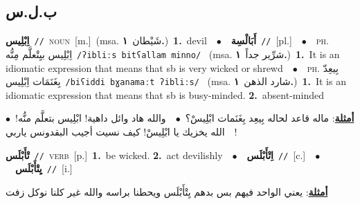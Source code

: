 \documentclass[10pt,a4paper,twoside]{article} %
\begin{document}
\begin{multicols}{2}
\vspace{-3mm}
\subsection*{\color{blue}\foreignlanguage{arabic}{ب.ل.س}\color{blue}{}} 

{\setlength\topsep{0pt}\textbf{\foreignlanguage{arabic}{اِبْلِيس}}\ {\color{gray}\texttt{//}\color{black}}\ \textsc{noun}\ [m.]\ \color{gray}(msa. \foreignlanguage{arabic}{شَيْطان}~\foreignlanguage{arabic}{\textbf{١.}})\color{black}\ \textbf{1.}~devil\ \ $\bullet$\ \ \setlength\topsep{0pt}\textbf{\foreignlanguage{arabic}{أَبَالْسِة}}\ {\color{gray}\texttt{//}\color{black}}\ [pl.]\ \ $\bullet$\ \ \textsc{ph.} \color{gray} \foreignlanguage{arabic}{اِبْلِيس بيِتْعلَّم مِنُّه}\color{black}\ {\color{gray}\texttt{/{\sffamily ʔibliːs bitʕallam minno}/}\color{black}}\ \color{gray} (msa. \foreignlanguage{arabic}{شرِّير جداً}~\foreignlanguage{arabic}{\textbf{١.}})\color{black}\ \textbf{1.}~It is an idiomatic expression that means that sb is very wicked or shrewd\ \ $\bullet$\ \ \textsc{ph.} \color{gray} \foreignlanguage{arabic}{بِيعِدّ بِغَنَمَات اِبْلِيس}\color{black}\ {\color{gray}\texttt{/{\sffamily biʕiddi bɣanamaːt ʔibliːs}/}\color{black}}\ \color{gray} (msa. \foreignlanguage{arabic}{شارد الذهن}~\foreignlanguage{arabic}{\textbf{١.}})\color{black}\ \textbf{1.}~It is an idiomatic expression that means that sb is busy-minded.  \textbf{2.}~absent-minded\  \begin{flushright}\color{gray}\foreignlanguage{arabic}{\textbf{\underline{\foreignlanguage{arabic}{أمثلة}}}: ماله قاعد لحاله بِيعِد بِغَنَمات ابْلِيسْ؟\ $\bullet$\ \  والله هاد وائل داهية! ابْلِيس بتعلَّم منُّه!\ $\bullet$\ \  الله يخزيك يا ابْلِيسْ! كيف نسيت أجيب البقدونس ياربي!}\end{flushright}\color{black}} \vspace{2mm}

{\setlength\topsep{0pt}\textbf{\foreignlanguage{arabic}{تْأَبْلَس}}\ {\color{gray}\texttt{//}\color{black}}\ \textsc{verb}\ [p.]\ \textbf{1.}~be wicked.  \textbf{2.}~act devilishly\ \ $\bullet$\ \ \setlength\topsep{0pt}\textbf{\foreignlanguage{arabic}{اِتْأَبْلَس}}\ {\color{gray}\texttt{//}\color{black}}\ [c.]\ \ $\bullet$\ \ \setlength\topsep{0pt}\textbf{\foreignlanguage{arabic}{يِتْأَبْلَس}}\ {\color{gray}\texttt{//}\color{black}}\ [i.]\  \begin{flushright}\color{gray}\foreignlanguage{arabic}{\textbf{\underline{\foreignlanguage{arabic}{أمثلة}}}: يعني الواحد فيهم بس بدهم يِتْأَبْلَس ويحطنا براسه والله غير كلنا نوكل زفت}\end{flushright}\color{black}} \vspace{2mm}


\end{multicols}
\end{document}

